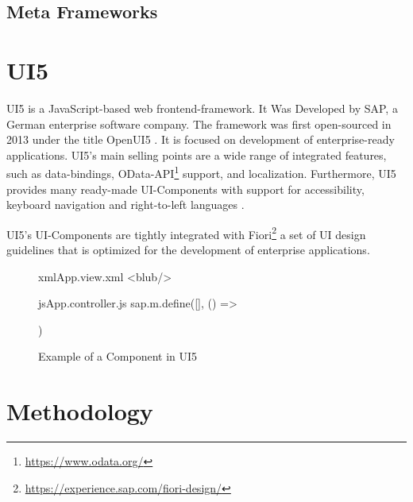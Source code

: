 \subsection{Meta Frameworks}



\section{UI5}
UI5 is a JavaScript-based web frontend-framework. It Was Developed by SAP, a German enterprise software company. The framework was first open-sourced in 2013 under the title OpenUI5 \cite{kurz_brief_2020}. It is focused on development of enterprise-ready applications. UI5's main selling points are a wide range of integrated features, such as data-bindings, OData-API\footnote{\url{https://www.odata.org/}} support, and localization. Furthermore, UI5 provides many ready-made UI-Components with support for accessibility, keyboard navigation and right-to-left languages \cite{kunz_what_2013}.   

UI5's UI-Components are tightly integrated with Fiori\footnote{\url{https://experience.sap.com/fiori-design/}} a set of UI design guidelines that is optimized for the development of enterprise applications.

\begin{figure}
  \begin{myminted}{xml}{App.view.xml}
    <blub/>
  \end{myminted}
  \begin{myminted}{js}{App.controller.js}
    sap.m.define([], () => {

    })
  \end{myminted}
  \caption{Example of a Component in UI5}
  \label{fig:ui5-mvc}
\end{figure}

\section{Methodology}
\label{sec:methodology}



